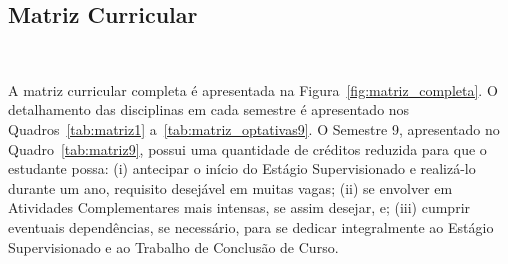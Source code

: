 





\subsection{Matriz Curricular}~\label{sec:matriz_curricular}


A matriz curricular completa é apresentada na Figura~\ref{fig:matriz_completa}. O detalhamento das disciplinas em cada semestre é apresentado nos Quadros~\ref{tab:matriz1} a~\ref{tab:matriz_optativas9}. O Semestre 9, apresentado no Quadro~\ref{tab:matriz9}, possui uma quantidade de créditos reduzida para que o estudante possa: (i) antecipar o início do Estágio Supervisionado e realizá-lo durante um ano, requisito desejável em muitas vagas; (ii) se envolver em Atividades Complementares mais intensas, se assim desejar, e; (iii) cumprir eventuais dependências, se necessário, para se dedicar integralmente ao Estágio Supervisionado e ao Trabalho de Conclusão de Curso.


